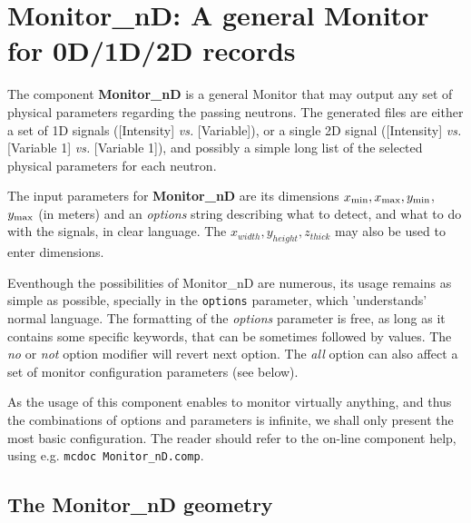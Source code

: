 \section{Monitor\_nD: A general Monitor for 0D/1D/2D records}
\label{s:monitornd}


The component {\bf Monitor\_nD} is a general Monitor that may output any
set of physical parameters regarding the passing neutrons. The
generated files are either a set of 1D signals ([Intensity] {\it vs.}
[Variable]), or a single 2D signal ([Intensity] {\it vs.} [Variable 1]
{\it vs.} [Variable 1]), and possibly a simple long list of the selected
physical parameters for each neutron.

The input parameters for {\bf Monitor\_nD} are its dimensions $x_{\rm
  min}, x_{\rm max}, y_{\rm min}$, $y_{\rm max}$ (in meters) and an {\it
  options} string describing what to detect, and what to do with the
signals, in clear language. The $x_{width}, y_{height}, z_{thick}$ may also be used to enter dimensions.

Eventhough the possibilities of Monitor\_nD are numerous, its usage remains as simple as possible, specially in the \verb+options+ parameter, which 'understands' normal language.
The formatting of the {\it options}
parameter is free, as long as it contains some specific keywords, that
can be sometimes followed by values. The {\it no} or {\it not} option
modifier will revert next option. The {\it all} option can also affect a
set of monitor configuration parameters (see below).

As the usage of this component enables to monitor virtually anything, and thus the combinations of options and parameters is infinite, we shall only present the most basic configuration. The reader should refer to the on-line component help, using e.g. \verb+mcdoc Monitor_nD.comp+.

\subsection{The Monitor\_nD geometry}

